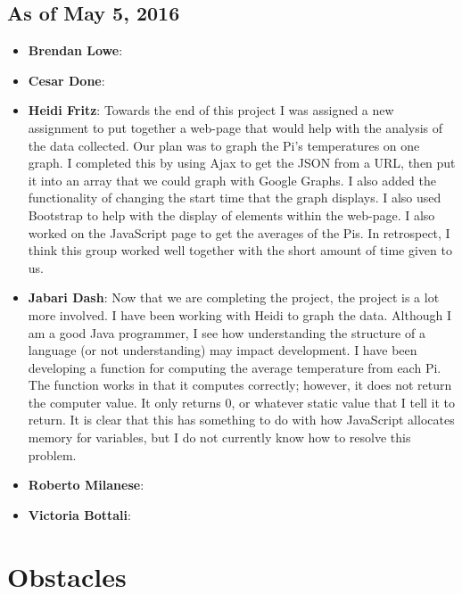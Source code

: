 \documentclass{article}
\begin{document}
			\subsection{As of May 5, 2016}
				\begin{itemize}
					\item {\bfseries Brendan Lowe}:
					\item {\bfseries Cesar Done}:
					\item {\bfseries Heidi Fritz}: Towards the end of this project I was assigned a new assignment to put together a web-page that would help   												   with the 
									   analysis of the data collected.  Our plan was to graph the Pi's temperatures on one graph.  I completed this by using 
									   Ajax to get the JSON from a URL, then put it into an array that we could graph with Google Graphs.  I also added the 
									   functionality of changing the start time that the graph displays.  I also used Bootstrap to help with the display of 
									   elements within the web-page.  I also worked on the JavaScript page to get the averages of the Pis.  In retrospect, I 
									   think this group worked well together with the short amount of time given to us.  
					\item {\bfseries Jabari Dash}: Now that we are completing the project, the project is a lot more involved. I have been working with
												   Heidi to graph the data. Although I am a good Java programmer, I see how understanding the structure
												   of a language (or not understanding) may impact development. I have been developing a function for 
												   computing the average temperature from each Pi. The function works in that it computes correctly; however,
												   it does not return the computer value. It only returns 0, or whatever static value that I tell it to 
												   return. It is clear that this has something to do with how  JavaScript allocates memory for variables,
												   but I do not currently know how to resolve this problem.
					\item {\bfseries Roberto Milanese}:
					\item {\bfseries Victoria Bottali}:			
				\end{itemize}
			
	\newpage
	\section{Obstacles}\label{sec:obstacles}	
\end{document}

